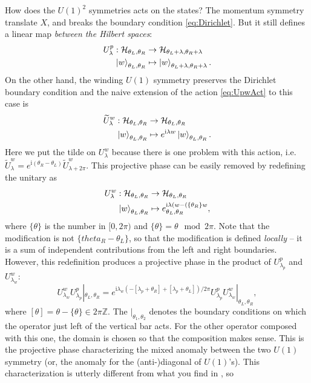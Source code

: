 \documentclass[
]{scrartcl}
\numberwithin{equation}{section}
\renewenvironment{align}{\begin{equation}\begin{aligned}}{\end{aligned}\end{equation}}
\theoremstyle{definition}
\theoremstyle{definition}
\theoremstyle{definition}
\theoremstyle{definition}
\theoremstyle{remark}
\begin{document}
How does the \(U(1)^2\) symmetries acts on the states?
The momentum symmetry translate \(X\), and breaks the boundary condition \eqref{eq:Dirichlet}.
But it still defines a linear map \emph{between the Hilbert spaces}:
\begin{align}
    \label{eq:UpactDirichlet}
    U^p_\lambda : \mathcal{H}_{\theta_L,\theta_R} &\to \mathcal{H}_{\theta_L+\lambda,\theta_R+\lambda}\\
    \ket{w}_{\theta_L,\theta_R} &\mapsto \ket{w}_{\theta_L+\lambda,\theta_R+\lambda}.
\end{align}
On the other hand, the winding \(U(1)\) symmetry preserves the Dirichlet boundary condition and the naive extension of the action \eqref{eq:UpwAct} to this case is
\begin{align}
    \label{eq:tildeUwactDirichlet}
    \widetilde{U}^w_\lambda : \mathcal{H}_{\theta_L,\theta_R} &\to \mathcal{H}_{\theta_L,\theta_R}\\
    \ket{w}_{\theta_L,\theta_R} &\mapsto e^{\mathrm{i}\lambda w}\ket{w}_{\theta_L,\theta_R}.
\end{align}
Here we put the tilde on \(U^w_\lambda\) because there is one problem with this action, i.e.~\(\widetilde{U}^w_\lambda = e^{\mathrm{i}(\theta_R-\theta_L)}\widetilde{U}^w_{\lambda+2\pi}\).
This projective phase can be easily removed by redefining the unitary as
\begin{align}
    \label{eq:UwactDirichlet}
    U^w_\lambda : \mathcal{H}_{\theta_L,\theta_R} &\to \mathcal{H}_{\theta_L,\theta_R}\\
    \ket{w}_{\theta_L,\theta_R} &\mapsto e^{\mathrm{i}\lambda (w-(\{\theta_R\}w}_{\theta_L,\theta_R},
\end{align}
where \(\{\theta\}\) is the number in \([0,2\pi)\) and \(\{\theta\} = \theta \mod 2\pi\). Note that the modification is not \(\{theta_R-\theta_L\}\), so that the modification is defined \emph{locally} -- it is a sum of independent contributions from the left and right boundaries.
However, this redefinition produces a projective phase in the product of \(U^p_{\lambda_p}\) and \(U^w_{\lambda_w}\):
\begin{equation}
    \label{eq:UpUwcomu}
    U^w_{\lambda_w}U^p_{\lambda_p}|_{\theta_L,\theta_R} = e^{\mathrm{i}\lambda_w(-[\lambda_p+\theta_R] + [\lambda_p+\theta_L])/2\pi} U^p_{\lambda_p}U^w_{\lambda_w}|_{\theta_L,\theta_R},
\end{equation}
where \([\theta] = \theta - \{\theta\} \in 2\pi \mathbb{Z}\).
The \(|_{\theta_1,\theta_2}\) denotes the boundary conditions on which the operator just left of the vertical bar acts. For the other operator composed with this one, the domain is chosen so that the composition makes sense.
This is the projective phase characterizing the mixed anomaly between the two \(U(1)\) symmetry (or, the anomaly for the (anti-)diagonal of \(U(1)\)'s).
This characterization is utterly different from what you find in \textcite{PolchinskiVol1}, so
\end{document}
